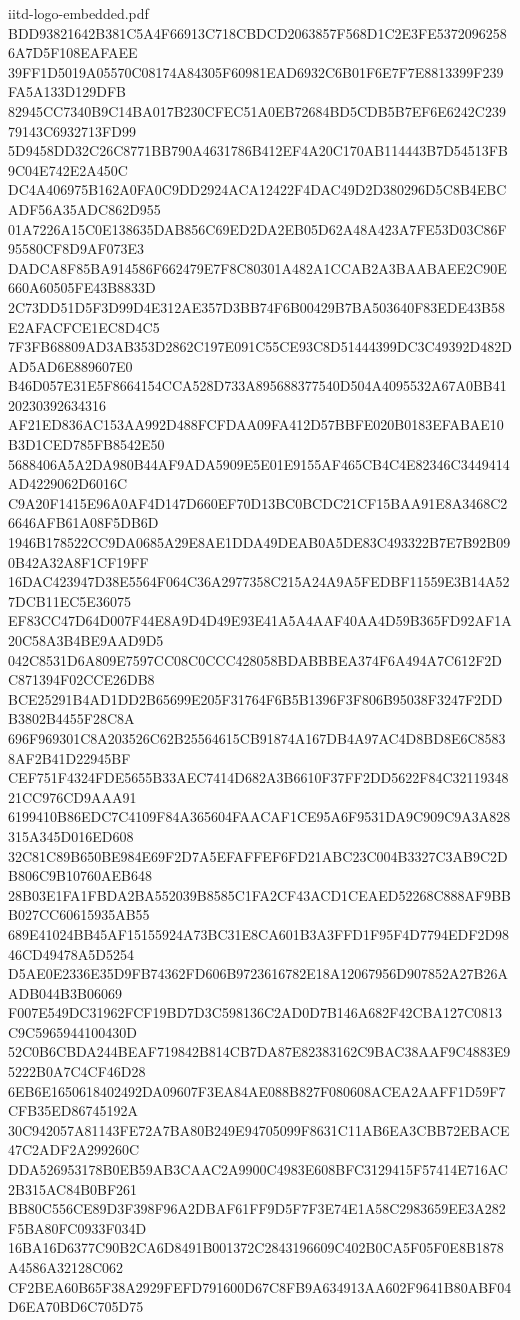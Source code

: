 \begin{filecontents*}[overwrite]{iitd-logo-embedded.pdf}
BDD93821642B381C5A4F66913C718CBDCD2063857F568D1C2E3FE53720962586A7D5F108EAFAEE
39FF1D5019A05570C08174A84305F60981EAD6932C6B01F6E7F7E8813399F239FA5A133D129DFB
82945CC7340B9C14BA017B230CFEC51A0EB72684BD5CDB5B7EF6E6242C23979143C6932713FD99
5D9458DD32C26C8771BB790A4631786B412EF4A20C170AB114443B7D54513FB9C04E742E2A450C
DC4A406975B162A0FA0C9DD2924ACA12422F4DAC49D2D380296D5C8B4EBCADF56A35ADC862D955
01A7226A15C0E138635DAB856C69ED2DA2EB05D62A48A423A7FE53D03C86F95580CF8D9AF073E3
DADCA8F85BA914586F662479E7F8C80301A482A1CCAB2A3BAABAEE2C90E660A60505FE43B8833D
2C73DD51D5F3D99D4E312AE357D3BB74F6B00429B7BA503640F83EDE43B58E2AFACFCE1EC8D4C5
7F3FB68809AD3AB353D2862C197E091C55CE93C8D51444399DC3C49392D482DAD5AD6E889607E0
B46D057E31E5F8664154CCA528D733A895688377540D504A4095532A67A0BB4120230392634316
AF21ED836AC153AA992D488FCFDAA09FA412D57BBFE020B0183EFABAE10B3D1CED785FB8542E50
5688406A5A2DA980B44AF9ADA5909E5E01E9155AF465CB4C4E82346C3449414AD4229062D6016C
C9A20F1415E96A0AF4D147D660EF70D13BC0BCDC21CF15BAA91E8A3468C26646AFB61A08F5DB6D
1946B178522CC9DA0685A29E8AE1DDA49DEAB0A5DE83C493322B7E7B92B090B42A32A8F1CF19FF
16DAC423947D38E5564F064C36A2977358C215A24A9A5FEDBF11559E3B14A527DCB11EC5E36075
EF83CC47D64D007F44E8A9D4D49E93E41A5A4AAF40AA4D59B365FD92AF1A20C58A3B4BE9AAD9D5
042C8531D6A809E7597CC08C0CCC428058BDABBBEA374F6A494A7C612F2DC871394F02CCE26DB8
BCE25291B4AD1DD2B65699E205F31764F6B5B1396F3F806B95038F3247F2DDB3802B4455F28C8A
696F969301C8A203526C62B25564615CB91874A167DB4A97AC4D8BD8E6C85838AF2B41D22945BF
CEF751F4324FDE5655B33AEC7414D682A3B6610F37FF2DD5622F84C3211934821CC976CD9AAA91
6199410B86EDC7C4109F84A365604FAACAF1CE95A6F9531DA9C909C9A3A828315A345D016ED608
32C81C89B650BE984E69F2D7A5EFAFFEF6FD21ABC23C004B3327C3AB9C2DB806C9B10760AEB648
28B03E1FA1FBDA2BA552039B8585C1FA2CF43ACD1CEAED52268C888AF9BBB027CC60615935AB55
689E41024BB45AF15155924A73BC31E8CA601B3A3FFD1F95F4D7794EDF2D9846CD49478A5D5254
D5AE0E2336E35D9FB74362FD606B9723616782E18A12067956D907852A27B26AADB044B3B06069
F007E549DC31962FCF19BD7D3C598136C2AD0D7B146A682F42CBA127C0813C9C5965944100430D
52C0B6CBDA244BEAF719842B814CB7DA87E82383162C9BAC38AAF9C4883E95222B0A7C4CF46D28
6EB6E1650618402492DA09607F3EA84AE088B827F080608ACEA2AAFF1D59F7CFB35ED86745192A
30C942057A81143FE72A7BA80B249E94705099F8631C11AB6EA3CBB72EBACE47C2ADF2A299260C
DDA526953178B0EB59AB3CAAC2A9900C4983E608BFC3129415F57414E716AC2B315AC84B0BF261
BB80C556CE89D3F398F96A2DBAF61FF9D5F7F3E74E1A58C2983659EE3A282F5BA80FC0933F034D
16BA16D6377C90B2CA6D8491B001372C2843196609C402B0CA5F05F0E8B1878A4586A32128C062
CF2BEA60B65F38A2929FEFD791600D67C8FB9A634913AA602F9641B80ABF04D6EA70BD6C705D75

\end{filecontents*}

